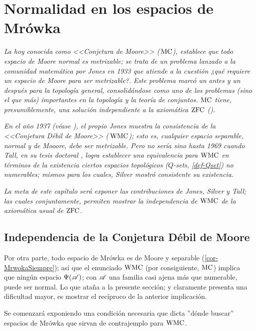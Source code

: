 \chapter{Normalidad en los espacios de Mrówka}

    \index[sym]{$\Pm$}\index[sym]{$\Pdm$}
    \emph{\small La hoy conocida como <<Conjetura de Moore>> (\,$\Pm$), establece que todo espacio de Moore normal es metrizable; se trata de un problema lanzado a la comunidad matemática por Jones en 1933 que atiende a la cuestión ¿qué requiere un espacio de Moore para ser metrizable?. Este problema marcó un antes y un después para la topología general, consolidándose como uno de los problemas (sino el que más) importantes en la topología y la teoría de conjuntos. $\Pm$ tiene, presumiblemente, una solución independiente a la axiomática $\operatorname{ZFC}$ (\cite[p.~429-435]{nyikosMoore}).}

    \emph{\small En el año 1937 (véase \cite[Teo~5, p.~ 676]{jonesCM}), el propio Jones muestra la consistencia de la <<Conjetura Débil de Moore>> (\,$\Pdm$); esto es, cualquier espacio separable, normal y de Mooore, debe ser metrizable. Pero no sería sino hasta 1969 cuando Tall, en su tesis doctoral \cite{tallTesis}, logra establecer una equivalencia para $\Pdm$ en términos de la existencia ciertos espacios topológicos ($Q$-sets, \autoref{def-Qset}) no numerables; mismos para los cuales, Silver mostró consistente su existencia.}

    \emph{\small La meta de este capítulo será exponer las contribuciones de Jones, Silver y Tall; las cuales conjuntamente, permiten mostrar la independencia de $\Pdm$ de la axiomática usual de $\operatorname{ZFC}$.}

    \section{Independencia de la Conjetura Débil de Moore}

    Por otra parte, todo espacio de Mrówka es de Moore y separable (\autoref{cor-MrwokaSiempre}); así que el enunciado $\Pdm$ (por consiguiente, $\Pm$) implica que ningún espacio $\Psi(\mathscr{A})$; con $\mathscr{A}$ una familia casi ajena más que numerable, puede ser normal. Lo que ataña a la presente sección; y claramente presenta una dificultad mayor, es mostrar el recíproco de la anterior implicación.

    Se comenzará exponiendo una condición necesaria que dicta ''dónde buscar'' espacios de Mrówka que sirvan de contrajemplo para $\Pdm$.

